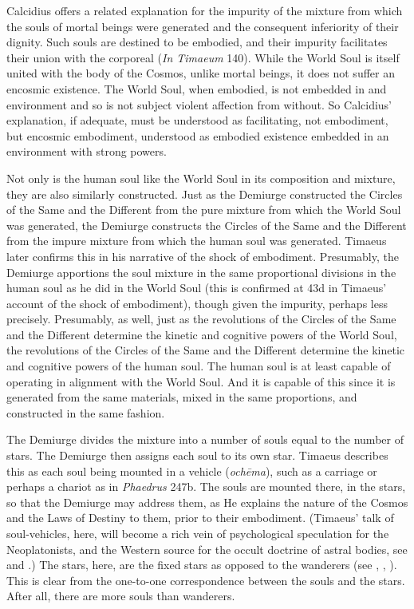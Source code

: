 Calcidius offers a related explanation for the impurity of the mixture from which the souls of mortal beings were generated and the consequent inferiority of their dignity. Such souls are destined to be embodied, and their impurity facilitates their union with the corporeal (\emph{In Timaeum} 140). While the World Soul is itself united with the body of the Cosmos, unlike mortal beings, it does not suffer an encosmic existence. The World Soul, when embodied, is not embedded in and environment and so is not subject violent affection from without. So Calcidius' explanation, if adequate, must be understood as facilitating, not embodiment, but encosmic embodiment, understood as embodied existence embedded in an environment with strong powers.

Not only is the human soul like the World Soul in its composition and mixture, they are also similarly constructed. Just as the Demiurge constructed the Circles of the Same and the Different from the pure mixture from which the World Soul was generated, the Demiurge constructs the Circles of the Same and the Different from the impure mixture from which the human soul was generated. Timaeus later confirms this in his narrative of the shock of embodiment. Presumably, the Demiurge apportions the soul mixture in the same proportional divisions in the human soul as he did in the World Soul (this is confirmed at 43d in Timaeus' account of the shock of embodiment), though given the impurity, perhaps less precisely. Presumably, as well, just as the revolutions of the Circles of the Same and the Different determine the kinetic and cognitive powers of the World Soul, the revolutions of the Circles of the Same and the Different determine the kinetic and cognitive powers of the human soul. The human soul is at least capable of operating in alignment with the World Soul. And it is capable of this since it is generated from the same materials, mixed in the same proportions, and constructed in the same fashion.

The Demiurge divides the mixture into a number of souls equal to the number of stars. The Demiurge then assigns each soul to its own star. Timaeus describes this as each soul being mounted in a vehicle (\emph{ochēma}), such as a carriage or perhaps a chariot as in \emph{Phaedrus} 247b. The souls are mounted there, in the stars, so that the Demiurge may address them, as He explains the nature of the Cosmos and the Laws of Destiny to them, prior to their embodiment. (Timaeus' talk of soul-vehicles, here, will become a rich vein of psychological speculation for the Neoplatonists, and the Western source for the occult doctrine of astral bodies, see \citealt[appendix 2]{Dodds:1963ul} and \citealt{Finamore:1985aa}.) The stars, here, are the fixed stars as opposed to the wanderers  (see \citealt[141--2 n13]{Archer-Hind:1888qd}, \citealt[255--6]{Taylor:1928qb}, \citealt[143]{Cornford:1935fk}). This is clear from the one-to-one correspondence between the souls and the stars. After all, there are more souls than wanderers.

